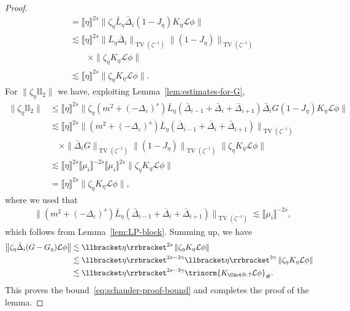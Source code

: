 \documentclass{article}
\makeatletter
\numberwithin{equation}{section}
\newcommand*\Cdot{{\mathpalette\Cdot@{.7}}}
\newcommand*\Cdot@[2]{\mathbin{\vcenter{\hbox{\scalebox{#2}{\hspace{0.1mm}$\m@th#1\bullet$\hspace{0.1mm}}}}}}
\theoremstyle{plain}
\theoremstyle{definition}
\makeatother
\begin{document}
\begin{proof}
\begin{align*}
    &= \llbracket \eta \rrbracket^{2 s}
    \| \zeta_{\eta} \bar{L}_{\eta} \bar{\Delta}_i
    (1 - J_{\eta}) K_{\eta} \mathcal{L} \phi \|\\
    &\lesssim  \llbracket \eta \rrbracket^{2 s}
    \| \bar{L}_{\eta} \bar{\Delta}_i \|_{\operatorname{TV} (\zeta^{- 1})}
    \| (1 - J_{\eta}) \| _{\operatorname{TV} (\zeta^{- 1})}\\
    &\qquad \times
    \| \zeta_{\eta} K_{\eta} \mathcal{L} \phi \|\\
    &\lesssim   \llbracket \eta \rrbracket^{2 s}
    \| \zeta_{\eta} K_{\eta} \mathcal{L} \phi \| .
  \end{align*}
  For $\| \zeta_{\eta}  \mathbb{I}\mathbb{I}_2 \|$ we have, exploiting
  Lemma~\ref{lem:estimates-for-G},
  \begin{align*}
    \| \zeta_{\eta}  \mathbb{I}\mathbb{I}_2 \|
    &\leqslant \llbracket \eta \rrbracket^{2 s}
    \| \zeta_{\eta}  (m^2 + (-\Delta_{\varepsilon})^s)
    \bar{L}_{\eta} (\bar{\Delta}_{i - 1} + \bar{\Delta}_i
    + \bar{\Delta}_{i + 1}) \bar\Delta_i G (1 - J_{\eta})
    K_{\eta} \mathcal{L} \phi \|\\
    &\lesssim \llbracket \eta \rrbracket^{2 s}
    \| (m^2 + (-\Delta_{\varepsilon})^s)\bar{L}_{\eta}
    (\bar{\Delta}_{i - 1} + \bar{\Delta}_i + \bar{\Delta}_{i + 1})
    \|_{\operatorname{TV}(\zeta^{- 1})}\\
    &\quad \times
    \| \bar{\Delta}_i G \|_{\operatorname{TV}(\zeta^{- 1})}
    \| (1 - J_{\eta}) \|_{\operatorname{TV}(\zeta^{- 1})}
    \| \zeta_{\eta} K_{\eta} \mathcal{L} \phi \|\\
    &\lesssim \llbracket \eta \rrbracket^{2 s}
    \llbracket \mu_i \rrbracket^{- 2 s}
    \llbracket \mu_i \rrbracket^{2 s}
    \| \zeta_{\eta} K_{\eta} \mathcal{L} \phi \|\\
    &= \llbracket \eta \rrbracket^{2 s}
    \| \zeta_{\eta} K_{\eta} \mathcal{L} \phi \|,
  \end{align*}
  where we used that
  \begin{align*}
    &\|(m^2 + (- \Delta_{\varepsilon})^s) 
     \bar{L}_{\eta} (\bar{\Delta}_{i - 1}  + \bar{\Delta}_i  + \bar{\Delta}_{i
     + 1}) \|_{\operatorname{TV} (\zeta^{- 1})}\lesssim \llbracket \mu_i \rrbracket^{- 2 s},
  \end{align*}
  which follows from Lemma~\ref{lem:LP-block}. Summing up, we have
  \begin{align*}
    \left\| {\zeta_{\eta} } \bar\Delta_i  (G - G_{\eta}) \mathcal{L} \phi \right\|
     &\lesssim \llbracket \eta \rrbracket^{2 s}  \left\| {\zeta_{\eta} } 
     K_{\eta} \mathcal{L} \phi \right\|\\
     &\lesssim \llbracket \eta \rrbracket^{2
     s - 3 \gamma}  \llbracket \eta \rrbracket^{3 \gamma}  \left\|
     {\zeta_{\eta} }  K_{\eta} \mathcal{L} \phi \right\|\\
     &\lesssim \llbracket
     \eta \rrbracket^{2 s - 3 \gamma}  \trinorm{ K_{\Cdot} \mathcal{L}
     \phi }_{\#} .
  \end{align*}
  This proves the bound~\eqref{eq:schauder-proof-bound} and completes the
  proof of the lemma.
\end{proof}
\end{document}
